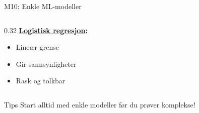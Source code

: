 \documentclass[aspectratio=169, 10pt]{beamer}
\begin{document}
\begin{frame}{M10: Enkle ML-modeller}
\begin{columns}
        \begin{column}{0.32\textwidth}
            \textbf{\href{https://en.wikipedia.org/wiki/Logistic_regression}{Logistisk regresjon}:}
            \begin{itemize}
                \item Lineær grense
                \item Gir sannsynligheter
                \item Rask og tolkbar
            \end{itemize}
            \begin{center}
            \end{center}
        \end{column}
    \end{columns}
    
    \vspace{5mm}
    
    \begin{block}{Tips}
        Start alltid med enkle modeller før du prøver komplekse!
    \end{block}
    
\end{frame}
\end{document}
